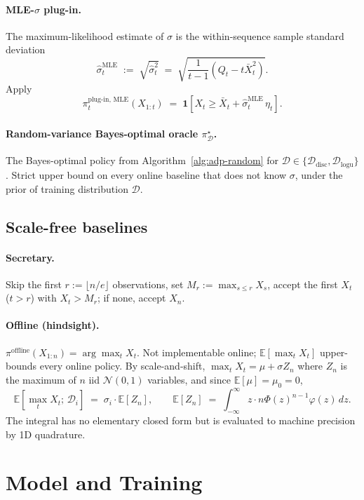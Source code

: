 \documentclass[11pt]{article}
\begin{document}
\paragraph{MLE-$\sigma$ plug-in.} The maximum-likelihood estimate of $\sigma$ is the within-sequence sample standard deviation
\[
\hat\sigma_t^{\mathrm{MLE}} \;:=\; \sqrt{\hat\sigma_t^2} \;=\; \sqrt{\frac{1}{t-1}\!\left(Q_t - t\bar X_t^2\right)}.
\]
Apply
\[
\pi_t^{\mathrm{plug\text{-}in,\,MLE}}(X_{1:t}) \;=\; \mathbf{1}[X_t \ge \bar X_t + \hat\sigma_t^{\mathrm{MLE}}\, \eta_t].
\]

\paragraph{Random-variance Bayes-optimal oracle $\pi^\star_{\mathcal{D}}$.} The Bayes-optimal policy from Algorithm~\ref{alg:adp-random} for $\mathcal{D} \in \{\mathcal{D}_{\mathrm{disc}}, \mathcal{D}_{\mathrm{logu}}\}$. Strict upper bound on every online baseline that does not know $\sigma$, under the prior of training distribution $\mathcal{D}$.

\subsection{Scale-free baselines}

\paragraph{Secretary.} Skip the first $r := \lfloor n/e \rfloor$ observations, set $M_r := \max_{s \le r} X_s$, accept the first $X_t$ ($t > r$) with $X_t > M_r$; if none, accept $X_n$.

\paragraph{Offline (hindsight).} $\pi^{\mathrm{offline}}(X_{1:n}) = \arg\max_t X_t$. Not implementable online; $\mathbb{E}[\max_t X_t]$ upper-bounds every online policy. By scale-and-shift, $\max_t X_t = \mu + \sigma Z_n$ where $Z_n$ is the maximum of $n$ iid $\mathcal{N}(0, 1)$ variables, and since $\mathbb{E}[\mu] = \mu_0 = 0$,
\[
\mathbb{E}[\max_t X_t;\, \mathcal{D}_i] \;=\; \sigma_i \cdot \mathbb{E}[Z_n], \qquad \mathbb{E}[Z_n] \;=\; \int_{-\infty}^{\infty} z \cdot n\Phi(z)^{n-1}\varphi(z)\, dz.
\]
The integral has no elementary closed form but is evaluated to machine precision by 1D quadrature.

\section{Model and Training}
\label{sec:training}
\end{document}
